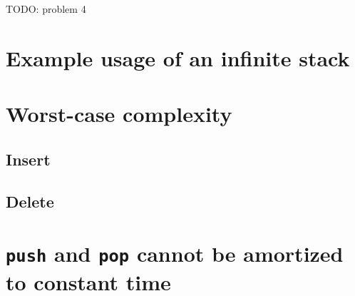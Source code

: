 TODO: problem 4

\section{Example usage of an infinite stack}

\section{Worst-case complexity}
  \subsection{Insert}
  \subsection{Delete}

\section{\texttt{push} and \texttt{pop} cannot be amortized to constant time}
